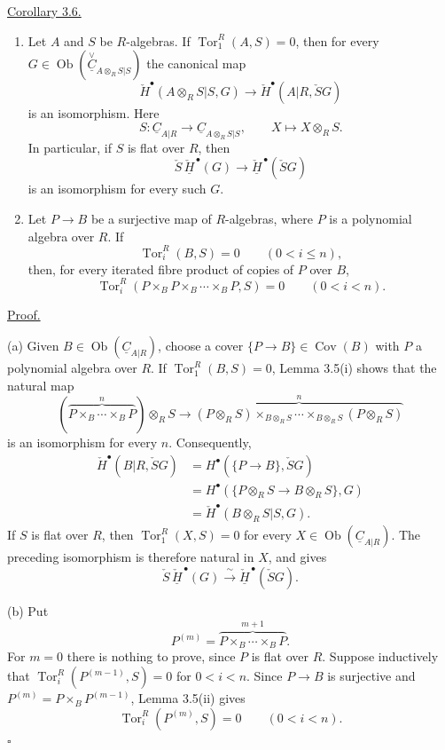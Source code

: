 \underline{Corollary 3.6.}

\begin{enumerate}[label=(\alph*)]
\item Let $A$ and $S$ be $R$-algebras. If
$\operatorname{Tor}_1^R(A,S)=0$, then for every
$G\in\operatorname{Ob}
(\overset{\vee}{\underline C}_{A\otimes_RS|S})$ the canonical map
\[
 \check H^{\bullet}(A\otimes_RS|S,G)
 \longrightarrow\check H^{\bullet}(A|R,\check SG)
\]
is an isomorphism. Here
\[
 S:\underline C_{A|R}\longrightarrow
 \underline C_{A\otimes_RS|S},
 \qquad X\longmapsto X\otimes_RS.
\]
In particular, if $S$ is flat over $R$, then
\[
 \check S\,\check{\underline H}^{\,\bullet}(G)
 \longrightarrow
 \check{\underline H}^{\,\bullet}(\check SG)
\]
is an isomorphism for every such $G$.

\item Let $P\longrightarrow B$ be a surjective map of $R$-algebras,
where $P$ is a polynomial algebra over $R$. If
\[
 \operatorname{Tor}_i^R(B,S)=0\qquad(0<i\leq n),
\]
then, for every iterated fibre product of copies of $P$ over $B$,
\[
 \operatorname{Tor}_i^R
 (P\times_B P\times_B\cdots\times_B P,S)=0
 \qquad(0<i<n).
\]
\end{enumerate}

\underline{Proof.}

(a) Given $B\in\operatorname{Ob}(\underline C_{A|R})$, choose a
cover $\{P\longrightarrow B\}\in\operatorname{Cov}(B)$ with $P$ a
polynomial algebra over $R$. If
$\operatorname{Tor}_1^R(B,S)=0$, Lemma 3.5(i) shows that the natural
map
\[
 \left(\overbrace{P\times_B\cdots\times_BP}^{n}\right)\otimes_RS
 \longrightarrow
 \overbrace{(P\otimes_RS)\times_{B\otimes_RS}\cdots
 \times_{B\otimes_RS}(P\otimes_RS)}^{n}
\]
is an isomorphism for every $n$. Consequently,
\begin{align*}
 \check H^{\bullet}(B|R,\check SG)
 &=H^{\bullet}(\{P\longrightarrow B\},\check SG)\\
 &=H^{\bullet}(\{P\otimes_RS\longrightarrow B\otimes_RS\},G)\\
 &=\check H^{\bullet}(B\otimes_RS|S,G).
\end{align*}
If $S$ is flat over $R$, then
$\operatorname{Tor}_1^R(X,S)=0$ for every
$X\in\operatorname{Ob}(\underline C_{A|R})$. The preceding
isomorphism is therefore natural in $X$, and gives
\[
 \check S\,\check{\underline H}^{\,\bullet}(G)
 \xrightarrow{\ \sim\ }
 \check{\underline H}^{\,\bullet}(\check SG).
\]

(b) Put
\[
 P^{(m)}=\overbrace{P\times_B\cdots\times_BP}^{m+1}.
\]
For $m=0$ there is nothing to prove, since $P$ is flat over $R$.
Suppose inductively that
$\operatorname{Tor}_i^R(P^{(m-1)},S)=0$ for $0<i<n$. Since
$P\longrightarrow B$ is surjective and
$P^{(m)}=P\times_BP^{(m-1)}$, Lemma 3.5(ii) gives
\[
 \operatorname{Tor}_i^R(P^{(m)},S)=0\qquad(0<i<n).
\]
\hfill$\square$
